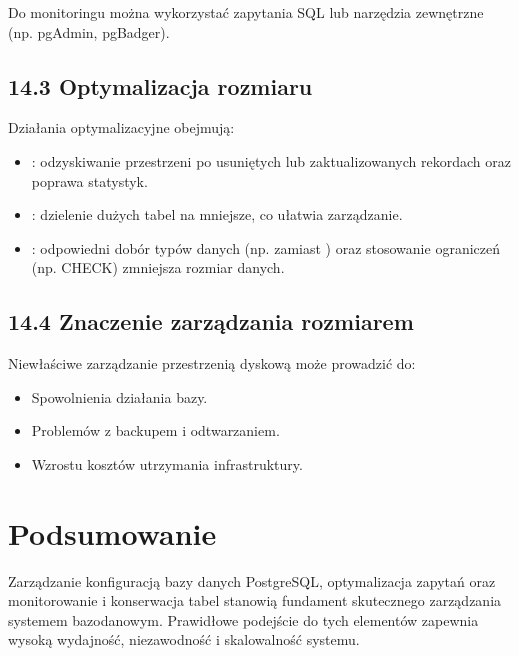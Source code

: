 \documentclass[a4paper,11pt,polish]{sphinxmanual}
\begin{document}
\sphinxAtStartPar
Do monitoringu można wykorzystać zapytania SQL lub narzędzia zewnętrzne (np. pgAdmin, pgBadger).


\subsection{14.3 Optymalizacja rozmiaru}
\label{\detokenize{Konfiguracja_baz_danych/Konfiguracja_baz_danych:optymalizacja-rozmiaru}}
\sphinxAtStartPar
Działania optymalizacyjne obejmują:
\begin{itemize}
\item {} 
\sphinxAtStartPar
{}: odzyskiwanie przestrzeni po usuniętych lub zaktualizowanych rekordach oraz poprawa statystyk.

\item {} 
\sphinxAtStartPar
{}: dzielenie dużych tabel na mniejsze, co ułatwia zarządzanie.

\item {} 
\sphinxAtStartPar
{}: odpowiedni dobór typów danych (np.  zamiast ) oraz stosowanie ograniczeń (np. CHECK) zmniejsza rozmiar danych.

\end{itemize}


\subsection{14.4 Znaczenie zarządzania rozmiarem}
\label{\detokenize{Konfiguracja_baz_danych/Konfiguracja_baz_danych:znaczenie-zarzadzania-rozmiarem}}
\sphinxAtStartPar
Niewłaściwe zarządzanie przestrzenią dyskową może prowadzić do:
\begin{itemize}
\item {} 
\sphinxAtStartPar
Spowolnienia działania bazy.

\item {} 
\sphinxAtStartPar
Problemów z backupem i odtwarzaniem.

\item {} 
\sphinxAtStartPar
Wzrostu kosztów utrzymania infrastruktury.

\end{itemize}


\section{Podsumowanie}
\label{\detokenize{Konfiguracja_baz_danych/Konfiguracja_baz_danych:podsumowanie}}
\sphinxAtStartPar
Zarządzanie konfiguracją bazy danych PostgreSQL, optymalizacja zapytań oraz monitorowanie i konserwacja tabel stanowią fundament skutecznego zarządzania systemem bazodanowym. Prawidłowe podejście do tych elementów zapewnia wysoką wydajność, niezawodność i skalowalność systemu.
\end{document}
